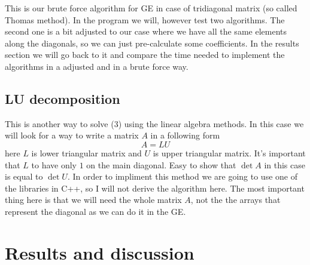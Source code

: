 \documentclass[10pt]{article}
\begin{document}
This is our brute force algorithm for GE in case of tridiagonal matrix (so called Thomas method). In the program we will, however test two algorithms. The second one is a bit adjusted to our case where we have all the same elements along the diagonals, so we can just pre-calculate some coefficients. In the results section we will go back to it and compare the time needed to implement the algorithms in a adjusted and in a brute force way.
\subsection{LU decomposition}
This is another way to solve (3) using the linear algebra methods. In this case we will look for a way to write a matrix $ A $ in a following form
\begin{equation}
A=LU
\end{equation}
here $ L $ is lower triangular matrix and $ U $ is upper triangular matrix. It's important that $ L $ to have only $ 1 $ on the main diagonal. Easy to show that $ \det A $ in this case is equal to $ \det U $. In order to impliment this method we are going to use one of the libraries in C++, so I will not derive the algorithm here. The most important thing here is that we will need the whole matrix $ A $, not the the arrays that represent the diagonal as we can do it in the GE.
\newpage
\section{Results and discussion}
\end{document}
